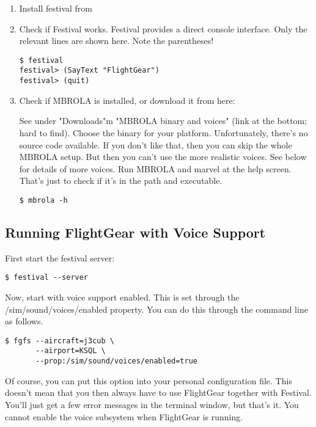 \begin{enumerate}
\item Install festival from 

\item Check if Festival works. Festival provides a direct console interface. Only the relevant lines are
shown here. Note the parentheses!

\begin{verbatim}
$ festival
festival> (SayText "FlightGear")
festival> (quit)
\end{verbatim}

\item Check if MBROLA is installed, or download it from here:


See under "Downloads"m "MBROLA binary and voices"
(link at the bottom; hard to find). Choose the binary for your platform. Unfortunately, there's no
source code available. If you don't like that, then you can skip the whole MBROLA setup.
But then you can't use the more realistic voices. See below for details of more voices.
Run MBROLA and marvel at the help screen. That's just to check if it's in the path and executable.

\begin{verbatim}
$ mbrola -h
\end{verbatim}
\end{enumerate}

\subsection{Running FlightGear with Voice Support}

First start the festival server:

\begin{verbatim}
$ festival --server
\end{verbatim}

Now, start \FlightGear{} with voice support enabled. This is set through the
/sim/sound/voices/enabled property. You can do this through the command line as follows.

\begin{verbatim}
$ fgfs --aircraft=j3cub \
       --airport=KSQL \
       --prop:/sim/sound/voices/enabled=true
\end{verbatim}

Of course, you can put this option into your personal configuration file.
This doesn't mean that you then always have to use FlightGear together with Festival.
You'll just get a few error messages in the terminal window, but that's it. You cannot enable
the voice subsystem when FlightGear is running.

